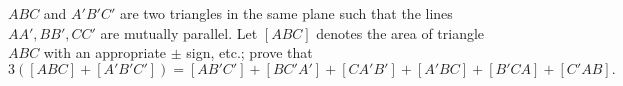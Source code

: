 $ ABC$ and $ A'B'C'$ are two triangles in the same plane such that the lines $ AA',BB',CC'$ are mutually parallel. Let $ [ABC]$ denotes the area of triangle $ ABC$ with an appropriate $ \pm$ sign, etc.; prove that\[ 3([ABC] + [A'B'C']) = [AB'C'] + [BC'A'] + [CA'B'] + [A'BC] + [B'CA] + [C'AB].\]